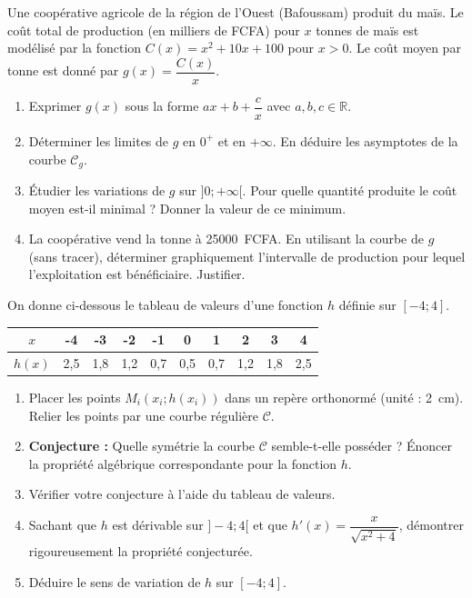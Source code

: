 \documentclass[11pt]{article}
\begin{document}
\begin{exercice}
Une coopérative agricole de la région de l'Ouest (Bafoussam) produit du maïs. Le coût total de production (en milliers de FCFA) pour $x$ tonnes de maïs est modélisé par la fonction $C(x)=x^2+10x+100$ pour $x>0$.
Le coût moyen par tonne est donné par $g(x)=\dfrac{C(x)}{x}$.
\begin{enumerate}
    \item Exprimer $g(x)$ sous la forme $ax+b+\dfrac{c}{x}$ avec $a,b,c \in \mathbb{R}$.
    \item Déterminer les limites de $g$ en $0^{+}$ et en $+\infty$. En déduire les asymptotes de la courbe $\mathcal{C}_g$.
    \item Étudier les variations de $g$ sur $]0;+\infty[$. Pour quelle quantité produite le coût moyen est-il minimal ? Donner la valeur de ce minimum.
    \item La coopérative vend la tonne à \SI{25000}{FCFA}. En utilisant la courbe de $g$ (sans tracer), déterminer graphiquement l'intervalle de production pour lequel l'exploitation est bénéficiaire. Justifier.
\end{enumerate}
\end{exercice}

\begin{exercice}
On donne ci-dessous le tableau de valeurs d'une fonction $h$ définie sur $[-4;4]$.
\begin{center}
\begin{tabular}{|c|c|c|c|c|c|c|c|c|c|}
\hline
$x$ & -4 & -3 & -2 & -1 & 0 & 1 & 2 & 3 & 4 \\
\hline
$h(x)$ & 2,5 & 1,8 & 1,2 & 0,7 & 0,5 & 0,7 & 1,2 & 1,8 & 2,5 \\
\hline
\end{tabular}
\end{center}
\begin{enumerate}
    \item Placer les points $M_i(x_i;h(x_i))$ dans un repère orthonormé (unité : \SI{2}{cm}). Relier les points par une courbe régulière $\mathcal{C}$.
    \item \textbf{Conjecture :} Quelle symétrie la courbe $\mathcal{C}$ semble-t-elle posséder ? Énoncer la propriété algébrique correspondante pour la fonction $h$.
    \item Vérifier votre conjecture à l'aide du tableau de valeurs.
    \item Sachant que $h$ est dérivable sur $]-4;4[$ et que $h'(x)=\dfrac{x}{\sqrt{x^2+4}}$, démontrer rigoureusement la propriété conjecturée.
    \item Déduire le sens de variation de $h$ sur $[-4;4]$.
\end{enumerate}
\end{exercice}
\end{document}
